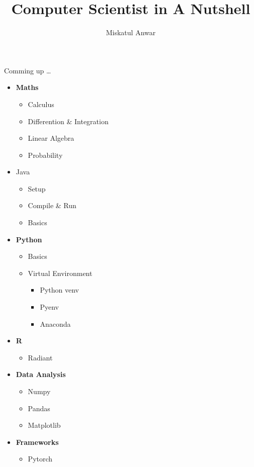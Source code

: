 \documentclass{book}
\title{Computer Scientist in A Nutshell}
\author{Miskatul Anwar}
\begin{document}
\maketitle
\newpage
\begin{flushright}
	Comming up \dots
\end{flushright}
\begin{itemize}
	\item  \textbf{Maths}
	      \begin{itemize}
		      \item Calculus
		      \item Differention \& Integration
		      \item Linear Algebra
		      \item Probability
	      \end{itemize}
	\item Java
	      \begin{itemize}
		      \item Setup
		      \item Compile \& Run
		      \item Basics
	      \end{itemize}
	\item \textbf{Python}
	      \begin{itemize}
		      \item Basics
		      \item Virtual Environment
		            \begin{itemize}
			            \item Python venv
			            \item Pyenv
			            \item Anaconda
		            \end{itemize}
	      \end{itemize}
	\item \textbf{R}
	      \begin{itemize}
		      \item Radiant
	      \end{itemize}
	\item  \textbf{Data Analysis}
	      \begin{itemize}
		      \item Numpy
		      \item Pandas
		      \item Matplotlib
	      \end{itemize}
	\item \textbf{Frameworks}
	      \begin{itemize}
		      \item Pytorch
	      \end{itemize}


\end{itemize}
\end{document}
